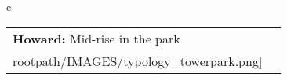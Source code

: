 \begin{table}[H]
        \begin{tabular}{c}
        \begin{tabular}{m{1.5in} m{2in}}
\textbf{Howard:} {Mid-rise in the park} & \texttt{[image: \\rootpath/IMAGES/typology\_towerpark.png]}
\end{tabular}\end{tabular}
        \end{table}